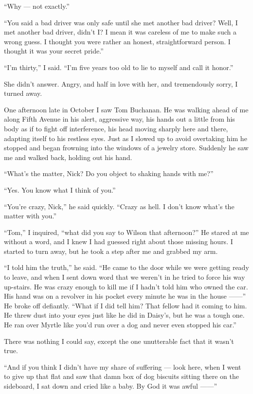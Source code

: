 \documentclass{znotebook}
\begin{document}
``Why — not exactly.''

``You said a bad driver was only safe until she met another bad driver? Well, I met another bad driver, didn't I? I mean it was careless of me to make such a wrong guess. I thought you were rather an honest, straightforward person. I thought it was your secret pride.''

``I'm thirty,'' I said. ``I'm five years too old to lie to myself and call it honor.''

She didn't answer. Angry, and half in love with her, and tremendously sorry, I turned away.

One afternoon late in October I saw Tom Buchanan. He was walking ahead of me along Fifth Avenue in his alert, aggressive way, his hands out a little from his body as if to fight off interference, his head moving sharply here and there, adapting itself to his restless eyes. Just as I slowed up to avoid overtaking him he stopped and began frowning into the windows of a jewelry store. Suddenly he saw me and walked back, holding out his hand.

``What's the matter, Nick? Do you object to shaking hands with me?''

``Yes. You know what I think of you.''

``You're crazy, Nick,'' he said quickly. ``Crazy as hell. I don't know what's the matter with you.''

``Tom,'' I inquired, ``what did you say to Wilson that afternoon?'' He stared at me without a word, and I knew I had guessed right about those missing hours. I started to turn away, but he took a step after me and grabbed my arm.

``I told him the truth,'' he said. ``He came to the door while we were getting ready to leave, and when I sent down word that we weren't in he tried to force his way up-stairs. He was crazy enough to kill me if I hadn't told him who owned the car. His hand was on a revolver in his pocket every minute he was in the house ——'' He broke off defiantly. ``What if I did tell him? That fellow had it coming to him. He threw dust into your eyes just like he did in Daisy's, but he was a tough one. He ran over Myrtle like you'd run over a dog and never even stopped his car.''

There was nothing I could say, except the one unutterable fact that it wasn't true.

``And if you think I didn't have my share of suffering — look here, when I went to give up that flat and saw that damn box of dog biscuits sitting there on the sideboard, I sat down and cried like a baby. By God it was awful ——''
\end{document}
